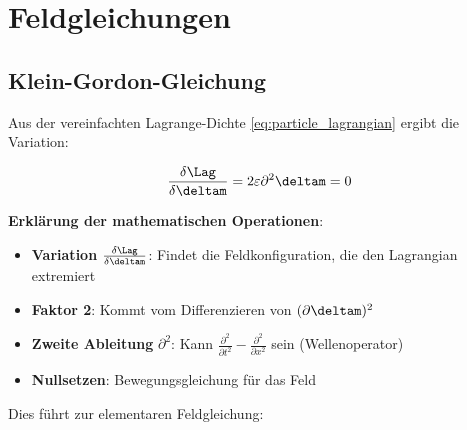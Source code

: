	\begin{table}[htbp]
		\centering
		\caption{Vereinheitlichte Beschreibung der Leptonfamilie}
		\label{tab:lepton_parameters}
	\end{table}
	
	\section{Feldgleichungen}
	
	\subsection{Klein-Gordon-Gleichung}
	
	Aus der vereinfachten Lagrange-Dichte \eqref{eq:particle_lagrangian} ergibt die Variation:
	
	\begin{equation}
		\frac{\delta \Lag}{\delta \deltam} = 2\varepsilon \partial^2 \deltam = 0
	\end{equation}
	
	\textbf{Erklärung der mathematischen Operationen}:
	\begin{itemize}
		\item \textbf{Variation} $\frac{\delta \Lag}{\delta \deltam}$: Findet die Feldkonfiguration, die den Lagrangian extremiert
		\item \textbf{Faktor 2}: Kommt vom Differenzieren von $(\partial \deltam)^2$
		\item \textbf{Zweite Ableitung} $\partial^2$: Kann $\frac{\partial^2}{\partial t^2} - \frac{\partial^2}{\partial x^2}$ sein (Wellenoperator)
		\item \textbf{Nullsetzen}: Bewegungsgleichung für das Feld
	\end{itemize}
	
	Dies führt zur elementaren Feldgleichung:
	
